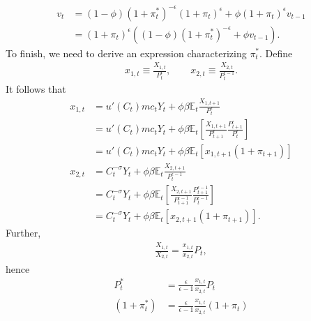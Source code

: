 \documentclass[12 pt, oneside]{article}
\theoremstyle{definition}
\theoremstyle{definition}
\theoremstyle{definition}
\newcommand{\E}{\mathbb{E}}
\begin{document}
\begin{align*}
  v_t & = (1 - \phi) ( 1  + \pi_t^*)^{-\epsilon} ( 1 + \pi_t)^{\epsilon}  +\phi(1 + \pi_t)^{\epsilon}  v_{t - 1}\\
      & = ( 1 + \pi_t)^{\epsilon}((1 - \phi) ( 1  + \pi_t^*)^{-\epsilon}   +\phi  v_{t - 1}).
\end{align*}
To finish, we need to derive an expression characterizing $\pi_t^*$. Define
\begin{align*}
  x_{1, t} \equiv \frac{X_{1, t}}{P_t^\epsilon},\quad\quad x_{2, t} \equiv \frac{X_{2, t}}{P_t^{\epsilon - 1}}.
\end{align*}
It follows that
\begin{align*}
  x_{1, t} & = u'(C_t)mc_t Y_t + \phi \beta \E_t \frac{X_{1, t + 1}}{P_t^\epsilon}\\
           & = u'(C_t)mc_t Y_t + \phi \beta \E_t\left[ \frac{X_{1, t + 1}}{P_{t + 1}^\epsilon}\frac{P_{t + 1}^\epsilon}{P_t^\epsilon}\right]\\
           & = u'(C_t)mc_t Y_t + \phi \beta \E_t[x_{1, t + 1}(1 + \pi_{t + 1})]\\
  x_{2, t} & = C_t^{-\sigma} Y_t + \phi \beta \E_t\frac{X_{2, t + 1}}{P_t^{\epsilon - 1}}\\
           & = C_t^{-\sigma} Y_t + \phi \beta \E_t\left[\frac{X_{2, t + 1}}{P_{t + 1}^{\epsilon - 1}}\frac{P_{t + 1}^{\epsilon - 1}}{P_t^{\epsilon - 1}}\right]\\
           & = C_t^{-\sigma} Y_t + \phi \beta \E_t[x_{2, t + 1}(1 + \pi_{t + 1})].
\end{align*}
Further,
\begin{align*}
  \frac{X_{1, t}}{X_{2, t}} = \frac{x_{1, t}}{x_{2, t}}P_t,
\end{align*}
hence
\begin{align*}
  P_t^* & = \frac{\epsilon}{\epsilon - 1}\frac{x_{1, t}}{x_{2, t}}P_t\\
  (1 + \pi_t^*) & = \frac{\epsilon}{\epsilon - 1}\frac{x_{1, t}}{x_{2, t}}(1 + \pi_t)\\
\end{align*}
\end{document}
